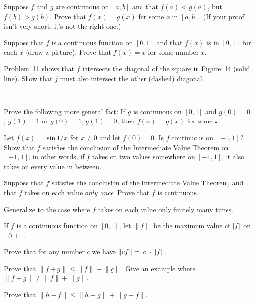  Suppose $f$ and $g$ are continuous on $[a,b]$ and that $f(a)<g(a)$,
but $f(b)>g(b)$. Prove that $f(x)=g(x)$ for some $x$ in $[a,b]$. (If your proof
isn't very short, it's not the right one.)

 Suppose that $f$ is a continuous function on $[0,1]$ and that
$f(x)$ is in $[0,1]$ for each $x$ (draw a picture). Prove that $f(x)=x$ for
some number $x$.

\begin{letters}
\item Problem~11 shows that $f$ intersects the diagonal of the square in
Figure~14 (solid line). Show that $f$ must also intersect the other (dashed)
diagonal.
\begin{center}
\\[0.6em]
\end{center}
\item Prove the following more general fact: If $g$ is continuous on $[0,1]$
and $g(0)=0$, $g(1)=1$ or $g(0)=1$, $g(1)=0$, then $f(x)=g(x)$ for some $x$.
\end{letters}

\begin{letters}
\item Let $f(x)=\sin 1/x$ for $x\neq 0$ and let $f(0)=0$. Is $f$ continuous on
$[-1,1]$? Show that $f$ satisfies the conclusion of the Intermediate Value
Theorem on $[-1,1]$; in other words, if $f$ takes on two values somewhere on
$[-1,1]$, it also takes on every value in between.
\item[\textbf{*(b)}] Suppose that $f$ satisfies the conclusion of the
Intermediate Value Theorem, and that $f$ takes on each value \emph{only once}.
Prove that $f$ is continuous.
\item[\textbf{*(c)}] Generalize to the case where $f$ takes on each value only
finitely many times.
\end{letters}

 If $f$ is a continuous function on $[0,1]$, let $\lVert f\rVert$ be
the maximum value of $\lvert f\rvert$ on $[0,1]$.
\begin{letters}
\item Prove that for any number $c$ we have $\lVert cf\rVert=\lvert c\rvert\cdot\lVert f\rVert$.
\item[\textbf{*(b)}] Prove that $\lVert f+g\rVert\leq\lVert f\rVert+\lVert g\rVert$.
Give an example where $\lVert f+g\rVert\neq\lVert f\rVert+\lVert g\rVert$.
\item Prove that $\lVert h-f\rVert\leq\lVert h-g\rVert+\lVert g-f\rVert$.
\end{letters}


